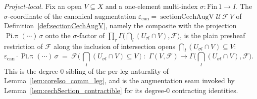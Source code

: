 \begin{lemma}
  \label{lem:sectionCechAugV_π}
  \textit{Project-local.}
  Fix an open \(V \subseteq X\) and a one-element multi-index \(\sigma : \mathrm{Fin}\,1 \to I\).
  The \(\sigma\)-coordinate of the canonical augmentation
  \(\varepsilon_{\mathrm{can}} = \operatorname{sectionCechAugV}\mathcal{U}\,\mathcal{F}\,V\) of
  Definition~\ref{def:sectionCechAugV}, namely the composite with the projection
  \(\operatorname{Pi.\pi}(\cdots)\,\sigma\) onto the \(\sigma\)-factor of
  \(\prod_\tau \Gamma\bigl(\bigcap_l(U_{\tau l}\cap V),\mathcal{F}\bigr)\), is the plain presheaf
  restriction of \(\mathcal{F}\) along the inclusion of intersection opens
  \(\bigcap_l(U_{\sigma l}\cap V) \subseteq V\):
  \[
    \varepsilon_{\mathrm{can}} \cdot \operatorname{Pi.\pi}(\cdots)\,\sigma
      \;=\;
    \mathcal{F}\bigl(\,\textstyle\bigcap_l(U_{\sigma l}\cap V)\subseteq V\,\bigr)
      \;:\; \Gamma(V,\mathcal{F}) \longrightarrow
      \Gamma\bigl(\textstyle\bigcap_l(U_{\sigma l}\cap V),\mathcal{F}\bigr).
  \]
  This is the degree-\(0\) sibling of the per-leg naturality of
  Lemma~\ref{lem:coreIso_comm_leg}, and is the augmentation seam invoked by
  Lemma~\ref{lem:cechSection_contractible} for its degree-\(0\) contracting identities.
\end{lemma}
